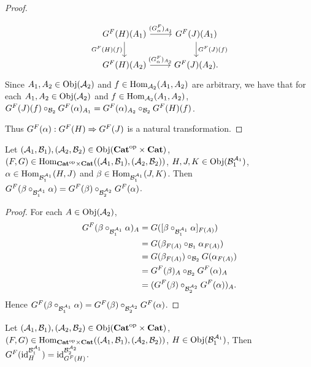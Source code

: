 \documentclass{book}
\begin{document}
\begin{proof}
\begin{itemize}
			\[
			\begin{tikzcd}
				G^F(H)(A_1)  \arrow[r, "(G^F_\al)_{A_1}"] \arrow[d, "{G^F(H)(f)}"'] & G^F(J)(A_1) \arrow[d, "{G^F(J)(f)}"] \\
				G^F(H)(A_2) \arrow[r, "(G^F_\al)_{A_2}"] &  G^F(J)(A_2).
			\end{tikzcd}
			\]
			Since $A_1, A_2 \in \Obj(\MA_2)$ and $f \in \Hom_{\MA_2}(A_1, A_2)$ are arbitrary, we have that for each $A_1, A_2 \in \Obj(\MA_2)$ and $f \in \Hom_{\MA_2}(A_1, A_2)$, $G^F(J)(f) \circ_{\MB_2} G^F(\al)_{A_1} = G^F(\al)_{A_2} \circ_{\MB_2} G^F(H)(f)$. 
		\end{itemize}
		Thus $G^F(\al):G^F(H) \Rightarrow G^F(J)$ is a natural transformation.
	\end{proof}
	
	\begin{ex} 
		Let $(\MA_1, \MB_1), (\MA_2, \MB_2) \in \Obj(\op{\bCat} \times \bCat)$, $(F,G) \in \Hom_{\op{\bCat} \times \bCat}((\MA_1, \MB_1), (\MA_2, \MB_2))$, $H,J, K \in \Obj(\MB_1^{\MA_1})$, $\al \in \Hom_{\MB_1^{\MA_1}}(H,J)$ and $\be \in \Hom_{\MB_1^{\MA_1}}(J,K)$. Then $G^F(\be \circ_{\MB_1^{\MA_1}} \al) = G^F(\be) \circ_{\MB_2^{\MA_2}} G^F(\al)$.
	\end{ex}
	
	\begin{proof}
		For each $A \in \Obj(\MA_2)$,
		\begin{align*}
			G^F(\be \circ_{\MB_1^{\MA_1}} \al)_A
			& = G([\be \circ_{\MB_1^{\MA_1}} \al]_{F(A)}) \\
			& = G(\be_{F(A)} \circ_{\MB_1} \al_{F(A)}) \\
			& = G(\be_{F(A)}) \circ_{\MB_2} G(\al_{F(A)}) \\
			& = G^F(\be)_A \circ_{\MB_2} G^F(\al)_A \\
			& = (G^F(\be) \circ_{\MB_2^{\MA_2}} G^F(\al))_A.
		\end{align*}
		Hence $G^F(\be \circ_{\MB_1^{\MA_1}} \al) = G^F(\be) \circ_{\MB_2^{\MA_2}} G^F(\al)$.
	\end{proof}
	
	\begin{ex} 
		Let $(\MA_1, \MB_1), (\MA_2, \MB_2) \in \Obj(\op{\bCat} \times \bCat)$, $(F,G) \in \Hom_{\op{\bCat} \times \bCat}((\MA_1, \MB_1), (\MA_2, \MB_2))$, $H \in \Obj(\MB_1^{\MA_1})$, Then $G^F(\id_H^{\MB_1^{\MA_1}}) = \id_{G^F(H)}^{\MB_2^{\MA_2}}$.
	\end{ex}
	
\end{document}
